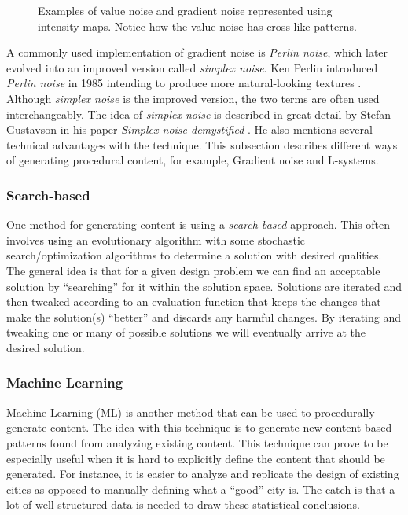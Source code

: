 \begin{figure}[h!]
  \caption{Examples of value noise and gradient noise represented using intensity maps. Notice how the value noise has cross-like patterns.}
  \label{fig:noisetypes}
\end{figure}

A commonly used implementation of gradient noise is \textit{Perlin noise}, which later evolved into an improved version called \textit{simplex noise}.
Ken Perlin introduced \textit{Perlin noise} in 1985 intending to produce more natural-looking textures \cite{perlin_noise}.
Although \textit{simplex noise} is the improved version, the two terms are often used interchangeably. The idea of \textit{simplex noise} is described in great detail by Stefan Gustavson in his paper \textit{Simplex noise demystified} \cite{simplex_noise}.
He also mentions several technical advantages with the technique.
This subsection describes different ways of generating procedural content, for example, Gradient noise and L-systems.

\subsubsection{Search-based}
One method for generating content is using a \textit{search-based} approach.
This often involves using an evolutionary algorithm with some stochastic search/optimization algorithms to determine a solution with desired qualities.
The general idea is that for a given design problem we can find an acceptable solution by ``searching'' for it within the solution space.
Solutions are iterated and then tweaked according to an evaluation function that keeps the changes that make the solution(s) ``better'' and discards any harmful changes.
By iterating and tweaking one or many of possible solutions we will eventually arrive at the desired solution.

\subsubsection{Machine Learning}
Machine Learning (ML) is another method that can be used to procedurally generate content.
The idea with this technique is to generate new content based patterns found from analyzing existing content.
This technique can prove to be especially useful when it is hard to explicitly define the content that should be generated.
For instance, it is easier to analyze and replicate the design of existing cities as opposed to manually defining what a ``good'' city is.
The catch is that a lot of well-structured data is needed to draw these statistical conclusions.


